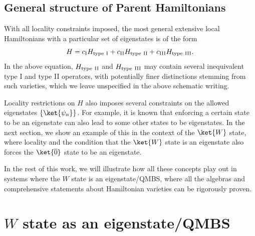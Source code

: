 \documentclass[prx,letterpaper,aps,superscriptaddress,floatfix,twocolumn,nofootinbib]{revtex4-2}
\theoremstyle{definition}
\begin{document}
%
\subsection{General structure of Parent Hamiltonians}
%
With all locality constraints imposed, the most general extensive local Hamiltonians with a particular set of eigenstates is of the form
\begin{equation}
    H = c_{\rm I} H_{\rm type\ I} + c_{\rm II} H_{\rm type\ II} + c_{\rm III} H_{\rm type\ III}.
\label{eq:mostgeneral}
\end{equation}
%
In the above equation, $H_{\rm type\ II}$ and $H_{\rm type\ III}$ may contain several inequivalent type I and type II operators, with potentially finer distinctions stemming from such varieties, which we leave unspecified in the above schematic writing.
%

%
Locality restrictions on $H$ also imposes several constraints on the allowed eigenstates $\{\ket{\psi_n} \}$. 
%
For example, it is known that enforcing a certain state to be an eigenstate can also lead to some other states to be eigenstates.
%
In the next section, we show an example of this in the context of the $\ket{W}$ state, where locality and the condition that the $\ket{W}$ state is an eigenstate also forces the $\ket{\overline{0}}$ state to be an eigenstate.
%

%
In the rest of this work, we will illustrate how all these concepts play out in systems where the $W$ state is an eigenstate/QMBS, where all the algebras and comprehensive statements about Hamiltonian varieties can be rigorously proven.
%

%
\section{$W$ state as an eigenstate/QMBS}\label{sec:WstateQMBS}
%
\end{document}
